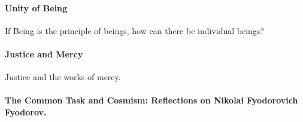 \paragraph{Unity of Being}


If Being is the principle of beings, how can there be individual beings?

\paragraph{Justice and Mercy}


Justice and the works of mercy.

\paragraph{The Common Task and Cosmism: Reflections on Nikolai Fyodorovich Fyodorov.}


